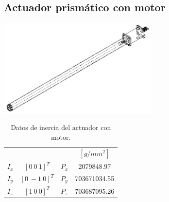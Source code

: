 \subsection{Actuador prismático con motor}
\includegraphics[width=8cm]{03_Reporte/img/ACTUATOR.JPG}
\begin{table}[hb!]
 \begin{center}
\begin{tabular}{lclc}


% 


 & & & $[g/mm^2]$\\
 $ I_x $ & $ [0 \ 0 \ 1]^T $ & $ P_x $ & 2079848.97\\
 $ I_y $ & $ [0 \ -1 \ 0]^T $ & $ P_y $ & 703671034.55\\
 $ I_z $ & $ [1 \ 0 \ 0]^T $ & $ P_z $ & 703687095.26
\end{tabular}
\end{center}
\caption{Datos de inercia del actuador con motor.}
\label{tab: inertia table motor}
\end{table}

